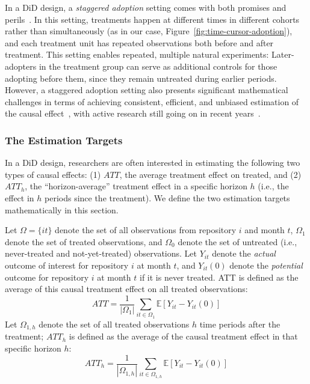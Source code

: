 
In a DiD design, a \textit{staggered adoption} setting comes with both promises and perils~\cite{athey2022design, borusyak2024revisiting}. 
In this setting, treatments happen at different times in different cohorts rather than simultaneously (as in our case, Figure~\ref{fig:time-cursor-adoption}), and each treatment unit has repeated observations both before and after treatment.
This setting enables repeated, multiple natural experiments: Later-adopters in the treatment group can serve as additional controls for those adopting before them, since they remain untreated during earlier periods. 
However, a staggered adoption setting also presents significant mathematical challenges in terms of achieving consistent, efficient, and unbiased estimation of the causal effect~\cite{dechaisemartin2020two, athey2022design, goodman2021difference}, with active research still going on in recent years~\cite{callaway2021difference, borusyak2024revisiting}.

\subsubsection{The Estimation Targets}
\label{sec:estimation-target}

In a DiD design, researchers are often interested in estimating the following two types of causal effects:
(1)  $ATT$, the average treatment effect on treated, and (2) $ATT_h$, the ``horizon-average'' treatment effect in a specific horizon $h$ (i.e., the effect in $h$ periods since the treatment). 
We define the two estimation targets mathematically in this section.

Let $\Omega =\{it\}$ denote the set of all observations from repository $i$ and month $t$, $\Omega_1$ denote the set of treated observations, and $\Omega_0$ denote the set of untreated (i.e., never-treated and not-yet-treated) observations.
Let $Y_{it}$ denote the \emph{actual} outcome of interest for repository $i$ at month $t$, and $Y_{it}(0)$ denote the \emph{potential} outcome for repository $i$ at month $t$ if it is never treated. 
ATT is defined as the average of this causal treatment effect on all treated observations:
\begin{equation}
\label{eq:att}
ATT=\frac{1}{|\Omega_1|}\sum_{it\in\Omega_1}\mathbb{E}[Y_{it} - Y_{it}(0)]
\end{equation}
Let $\Omega_{1,h}$ denote the set of all treated observations $h$ time periods after the treatment; $ATT_h$ is defined as the average of the causal treatment effect in that specific horizon $h$: 
\begin{equation}
\label{eq:atth}
ATT_h=\frac{1}{|\Omega_{1,h}|}\sum_{it\in\Omega_{1,h}}\mathbb{E}[Y_{it} - Y_{it}(0)]
\end{equation}

